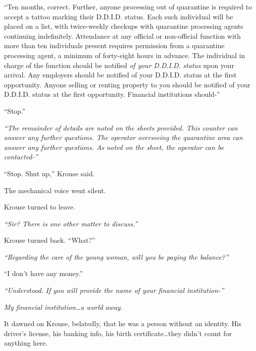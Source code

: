 ``Ten months, correct.  Further, anyone processing out of quarantine is required to accept a tattoo marking their D.D.I.D. status.  Each such individual will be placed on a list, with twice-weekly checkups with quarantine processing agents continuing indefinitely.  Attendance at any official or non-official function with more than ten individuals present requires permission from a quarantine processing agent, a minimum of forty-eight hours in advance.  The individual in charge of the function should be notified \emph{of your D.D.I.D. status} upon your arrival.  Any employers should be notified of your D.D.I.D. status at the first opportunity.  Anyone selling or renting property to you should be notified of your D.D.I.D. status at the first opportunity.  Financial institutions should-''



``Stop.''



\emph{``The remainder of details are noted on the sheets provided.  This counter can answer any further questions.  The operator overseeing the quarantine area can answer any further questions.  As noted on the sheet, the operator can be contacted-''}



``Stop.  Shut up,'' Krouse said.



The mechanical voice went silent.



Krouse turned to leave.



\emph{``Sir?  There is one other matter to discuss.''}



Krouse turned back.  ``What?''



\emph{``Regarding the care of the young woman, will you be paying the balance?''}



``I don't have any money.''



\emph{``Understood.  If you will provide the name of your financial institution-''}



\emph{My financial institution\ldots a world away.}



It dawned on Krouse, belatedly, that he was a person without an identity.  His driver's license, his banking info, his birth certificate\ldots they didn't count for anything here.



